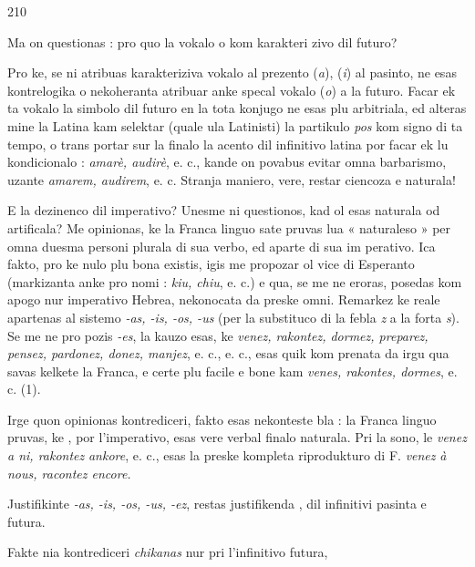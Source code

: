 \begin{VUpage}[214]{210}

Ma on questionas : pro quo la vokalo o kom karakteri\cc
zivo dil futuro?

Pro ke, se ni atribuas karakteriziva vokalo al prezento\nl
(\textit{a}),  (\textit{i}) al pasinto, ne esas kontrelogika o nekoheranta\nl
atribuar anke specal vokalo (\textit{o}) a la futuro. Facar ek ta\nl
vokalo la simbolo dil futuro en la tota konjugo ne esas plu\nl
arbitriala, ed alteras mine la Latina kam selektar (quale ula\nl
Latinisti) la partikulo \textit{pos} kom signo di ta tempo, o trans\cc
portar sur la finalo la acento dil infinitivo latina por facar\nl
ek lu kondicionalo : \textit{amarè, audirè}, e. c., kande on povabus\nl
evitar omna barbarismo, uzante \textit{amarem, audirem}, e. c.\nl
Stranja maniero, vere, restar ciencoza e naturala!

E la dezinenco  dil imperativo? Unesme ni questionos,\nl
kad ol esas naturala od artificala? Me opinionas, ke la\nl
Franca linguo sate pruvas lua « naturaleso » per omna\nl
duesma personi plurala di sua verbo, ed aparte di sua im\cc
perativo. Ica fakto, pro ke nulo plu bona existis, igis me\nl
propozar ol vice  di Esperanto (markizanta anke pro\cc
nomi : \textit{kiu, chiu}, e. c.) e qua, se me ne eroras, posedas kom\nl
apogo nur imperativo Hebrea, nekonocata da preske omni.\nl
Remarkez ke  reale apartenas al sistemo \textit{-as, -is, -os, -us}\nl
(per la substituco di la febla \textit{z} a la forta \textit{s}). Se me ne pro\cc
pozis \textit{-es}, la kauzo esas, ke \textit{venez, rakontez, dormez, preparez,}\nl
\textit{pensez, pardonez, donez, manjez}, e. c., e. c., esas quik kom\cc
prenata da irgu qua savas kelkete la Franca, e certe plu\nl
facile e bone kam \textit{venes, rakontes, dormes}, e. c. (1).

Irge quon opinionas kontrediceri, fakto esas nekonteste\cc
bla : la Franca linguo pruvas, ke , por l'imperativo, esas\nl
vere verbal finalo naturala. Pri la sono, le \textit{venez a ni, rakontez}\nl
\textit{ankore}, e. c., esas la preske kompleta riprodukturo di F. \textit{venez}\nl
\textit{à nous, racontez encore.}

Justifikinte \textit{-as, -is, -os, -us, -ez}, restas justifikenda ,\nl
{} dil infinitivi pasinta e futura.

Fakte nia kontrediceri \textit{chikanas} nur pri l'infinitivo futura,\parplein
\end{VUpage}

